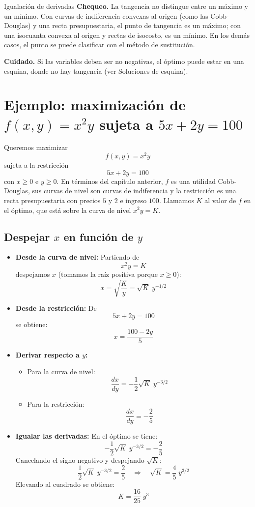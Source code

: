 \documentclass{article}
\newcommand{\rotulo}[2][principal]{\textsf{\bfseries\color{#1}#2}\enspace}
\begin{document}
\begin{metodo}[label=met:igualacion]{Igualación de derivadas}
\rotulo{Chequeo.} La tangencia no distingue entre un máximo y un mínimo. Con curvas de indiferencia convexas al origen (como las Cobb-Douglas) y una recta presupuestaria, el punto de tangencia es un máximo; con una isocuanta convexa al origen y rectas de isocosto, es un mínimo. En los demás casos, el punto se puede clasificar con el método de sustitución.
 
\rotulo{Cuidado.} Si las variables deben ser no negativas, el óptimo puede estar en una esquina, donde no hay tangencia (ver Soluciones de esquina).
\end{metodo}
 
 
\section*{Ejemplo: maximización de \(f(x,y)=x^2y\) sujeta a \(5x+2y=100\)}
 
Queremos maximizar
\[
f(x,y)=x^2y
\]
sujeta a la restricción
\[
5x+2y=100
\]
con \(x\geq 0\) e \(y\geq 0\). En términos del capítulo anterior, \(f\) es una utilidad Cobb-Douglas, sus curvas de nivel son curvas de indiferencia y la restricción es una recta presupuestaria con precios \(5\) y \(2\) e ingreso \(100\). Llamamos \(K\) al valor de \(f\) en el óptimo, que está sobre la curva de nivel \(x^2y=K\).
 
\subsection*{Despejar \(x\) en función de \(y\)}
 
\begin{itemize}
    \item \textbf{Desde la curva de nivel:}
    Partiendo de
    \[
    x^2y=K
    \]
    despejamos \(x\) (tomamos la raíz positiva porque \(x\geq 0\)):
    \[
    x=\sqrt{\frac{K}{y}}=\sqrt{K}\;y^{-1/2}
    \]
 
    \item \textbf{Desde la restricción:}
    De
    \[
    5x+2y=100
    \]
    se obtiene:
    \[
    x=\frac{100-2y}{5}
    \]
 
    \item \textbf{Derivar respecto a \(y\):}
    \begin{itemize}
        \item Para la curva de nivel:
        \[
        \frac{dx}{dy}=-\frac{1}{2}\sqrt{K}\;y^{-3/2}
        \]
        \item Para la restricción:
        \[
        \frac{dx}{dy}=-\frac{2}{5}
        \]
    \end{itemize}
 
    \item \textbf{Igualar las derivadas:}
    En el óptimo se tiene:
    \[
    -\frac{1}{2}\sqrt{K}\;y^{-3/2}=-\frac{2}{5}
    \]
    Cancelando el signo negativo y despejando \(\sqrt{K}\):
    \[
    \frac{1}{2}\sqrt{K}\;y^{-3/2}=\frac{2}{5} \quad\Longrightarrow\quad \sqrt{K}=\frac{4}{5}\;y^{3/2}
    \]
    Elevando al cuadrado se obtiene:
    \[
    K=\frac{16}{25}\;y^3
    \]
\end{itemize}
 
\end{document}

